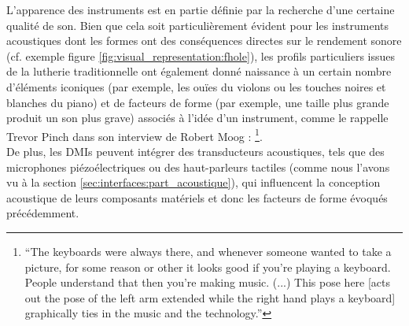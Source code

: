 \noindent L'apparence des instruments est en partie définie par la recherche d'une certaine qualité de son. Bien que cela soit particulièrement évident pour les instruments acoustiques dont les formes ont des conséquences directes sur le rendement sonore (cf. exemple figure \ref{fig:visual_representation:fhole}), les profils particuliers issues de la lutherie traditionnelle ont également donné naissance à un certain nombre d'éléments iconiques (par exemple, les ouïes du violons ou les touches noires et blanches du piano) et de facteurs de forme (par exemple, une taille plus grande produit un son plus grave) associés à l'idée d'un instrument, comme le rappelle Trevor Pinch dans son interview de Robert Moog \cite{pinch_why_2001}: \footnote{``The keyboards were always there, and whenever someone wanted to take a picture, for some reason or other it looks good if you’re playing a keyboard. People understand that then you’re making music. (...) This pose here [acts out the pose of the left arm extended while the right hand plays a keyboard] graphically ties in the music and the technology.''}.\\
\indent De plus, les \glspl{DMI} peuvent intégrer des transducteurs acoustiques, tels que des microphones piézoélectriques ou des haut-parleurs tactiles (comme nous l'avons vu à la section \ref{sec:interfaces:part_acoustique}), qui influencent la conception acoustique de leurs composants matériels et donc les facteurs de forme évoqués précédemment.

